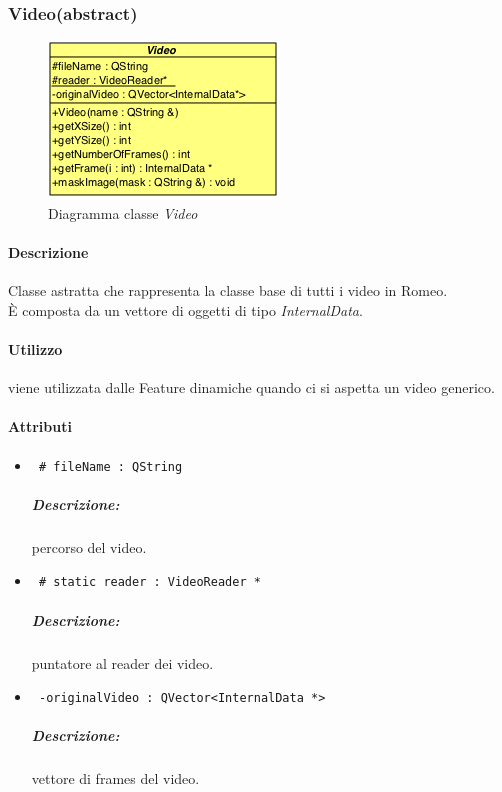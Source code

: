 \subsubsection{Video(abstract)}
\label{Video}
\begin{figure}[!h]
\centering
			\includegraphics[scale=1]{./Content/Immagini/modelCore/Video.png}
			\caption{Diagramma classe \textsl{Video}}
			\label{RGBVideo_img}
\end{figure}

\paragraph{Descrizione \\}
Classe astratta che rappresenta la classe base di tutti i video in Romeo\g{}.
\\È composta da un vettore di oggetti di tipo \textsl{InternalData}.

\paragraph{Utilizzo \\}
viene utilizzata dalle Feature\g{} dinamiche quando ci si aspetta un video generico.

\paragraph{Attributi\\}
	\begin{itemize}
		\item  \color{teal}\verb! # fileName : QString!\\
		\color{black}
		\subparagraph{Descrizione:} percorso del video.
		 
		 \item \color{teal}\verb! # static reader : VideoReader *!\\
		 \color{black}
		 \subparagraph{Descrizione:} puntatore al reader dei video.
		 
		 \item \color{teal}\verb! -originalVideo : QVector<InternalData *>!\\
		 \color{black}
		 \subparagraph{Descrizione:} vettore di frames del video.
	\end{itemize}
	
